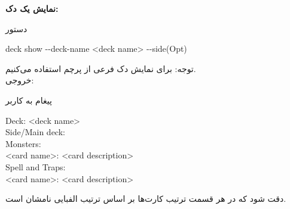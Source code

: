 \documentclass[]{article}
\begin{document}
\vspace{.5cm}
\textbf{نمایش یک دک:}
\begin{mybox}[colback=yellow]{دستور}
	\begin{latin}	
		deck show -{}-deck-name <deck name> -{}-side(Opt)
	\end{latin}
\end{mybox}
توجه: برای نمایش دک فرعی از پرچم   استفاده می‌کنیم.
\\
خروجی:
\begin{mybox}[colback=yellow]{پیغام به کاربر}
	\begin{latin}	
		Deck: <deck name> \\
		Side/Main deck: \\
		Monsters: \\
		<card name>: <card description> \\
		Spell and Traps: \\
		<card name>: <card description> \\
	\end{latin}
\end{mybox}
دقت شود که در هر قسمت ترتیب کارت‌ها بر اساس ترتیب الفبایی نامشان است.
\end{document}
